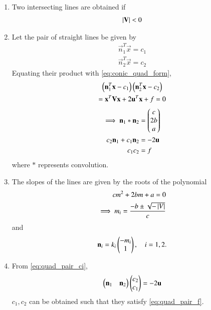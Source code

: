 \renewcommand{\theequation}{\theenumi}
\begin{enumerate}[label=\thesection.\arabic*.,ref=\thesection.\theenumi]

\item Two intersecting lines are obtained if 
\begin{align}
\label{eq:quad_pair_det}
\left\vert\mathbf{V}\right\vert < 0
\end{align}

\item Let the pair of straight lines be given by 
\begin{align}
\label{eq:quad_pair_lines}
\vec{n}_1^T \vec{x} = c_1
\\
\vec{n}_2^T \vec{x} = c_2
\end{align}
Equating their product with \eqref{eq:conic_quad_form},
\begin{multline}
\left(\mathbf{n}_1^T \mathbf{x} - c_1\right)
\left(\mathbf{n}_2^T \mathbf{x} - c_2\right) 
\\
=
\mathbf{x}^T\mathbf{V}\mathbf{x}+2\mathbf{u}^T\mathbf{x}+f=0
\end{multline}
\begin{align}
\implies 
\mathbf{n}_1 *\mathbf{n}_2  &= \begin{pmatrix}c \\ 2b \\a\end{pmatrix}
\label{eq:quad_pair_conv}
\\
c_2\mathbf{n}_1 + c_1 \mathbf{n}_2 &= -2\mathbf{u}
\label{eq:quad_pair_ci}
\\
c_1 c_2 &= f
\label{eq:quad_pair_f}
\end{align}
%
where $*$ represents convolution.
\item The slopes of the lines are given by the roots of the polynomial
\begin{align}
\label{eq:quad_pair_slopes}
cm^2 + 2bm + a = 0
\\
\implies m_i = \frac{-b \pm \sqrt{-\left\vert V\right\vert}}{c}
\end{align}
and 
\begin{align}
\mathbf{n}_i = k_i\begin{pmatrix}-m_i\\1\end{pmatrix}, \quad i = 1,2.
\end{align}
\item From \eqref{eq:quad_pair_ci},
\begin{align}
\label{eq:quad_pair_ci_mat}
\begin{pmatrix}\mathbf{n}_1 & \mathbf{n}_2\end{pmatrix}\begin{pmatrix}c_2\\c_1\end{pmatrix} = -2\mathbf{u}
\end{align}
$c_1,c_2$ can be obtained such that they satisfy \eqref{eq:quad_pair_f}.


\end{enumerate}
